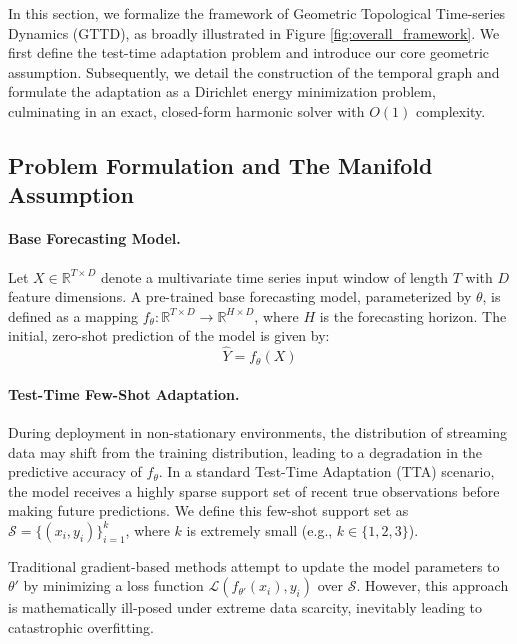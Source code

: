 \documentclass{article}
\begin{document}
	In this section, we formalize the framework of Geometric Topological Time-series Dynamics (GTTD), as broadly illustrated in Figure \ref{fig:overall_framework}. We first define the test-time adaptation problem and introduce our core geometric assumption. Subsequently, we detail the construction of the temporal graph and formulate the adaptation as a Dirichlet energy minimization problem, culminating in an exact, closed-form harmonic solver with $O(1)$ complexity.
	
	\subsection{Problem Formulation and The Manifold Assumption}
	
	\paragraph{Base Forecasting Model.} Let $X \in \mathbb{R}^{T \times D}$ denote a multivariate time series input window of length $T$ with $D$ feature dimensions. A pre-trained base forecasting model, parameterized by $\theta$, is defined as a mapping $f_\theta: \mathbb{R}^{T \times D} \rightarrow \mathbb{R}^{H \times D}$, where $H$ is the forecasting horizon. The initial, zero-shot prediction of the model is given by:
	\begin{equation}
		\hat{Y} = f_\theta(X)
	\end{equation}
	
	\paragraph{Test-Time Few-Shot Adaptation.} During deployment in non-stationary environments, the distribution of streaming data may shift from the training distribution, leading to a degradation in the predictive accuracy of $f_\theta$. In a standard Test-Time Adaptation (TTA) scenario, the model receives a highly sparse support set of recent true observations before making future predictions. We define this few-shot support set as $\mathcal{S} = \{(x_i, y_i)\}_{i=1}^k$, where $k$ is extremely small (e.g., $k \in \{1, 2, 3\}$). 
	
	Traditional gradient-based methods attempt to update the model parameters to $\theta'$ by minimizing a loss function $\mathcal{L}(f_{\theta'}(x_i), y_i)$ over $\mathcal{S}$. However, this approach is mathematically ill-posed under extreme data scarcity, inevitably leading to catastrophic overfitting.
	
\end{document}
